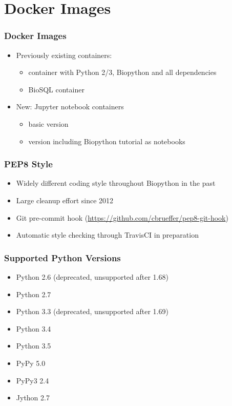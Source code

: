 \documentclass[trans]{beamer}
\begin{document}

\section{Docker Images}
\frame
{
  \frametitle{Docker Images}

  \begin{itemize}
  \item Previously existing containers:
    \begin{itemize}
    \item container with Python 2/3, Biopython and all dependencies
    \item BioSQL container
  \end{itemize}
  \item New: Jupyter notebook containers
    \begin{itemize}
      \item basic version
      \item version including Biopython tutorial as notebooks
    \end{itemize}
  \end{itemize}
}


\frame
{
  \frametitle{PEP8 Style}
  
  \begin{itemize}
  \item Widely different coding style throughout Biopython in the past
  \item Large cleanup effort since 2012
  \item Git pre-commit hook (\url{https://github.com/cbrueffer/pep8-git-hook})
  \item Automatic style checking through TravisCI in preparation
  \end{itemize}
}

\frame
{
  \frametitle{Supported Python Versions}
  
  \begin{itemize}
  \item Python 2.6 (deprecated, unsupported after 1.68)
  \item Python 2.7
  \item Python 3.3 (deprecated, unsupported after 1.69)
  \item Python 3.4
  \item Python 3.5
  \item PyPy 5.0
  \item PyPy3 2.4
  \item Jython 2.7
  \end{itemize}  
}
\end{document}
